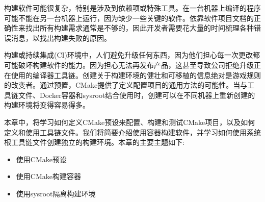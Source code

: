 构建软件可能很复杂，特别是涉及到依赖项或特殊工具。在一台机器上编译的程序可能不能在另一台机器上运行，因为缺少一些关键的软件。依靠软件项目文档的正确性来找出所有构建需求通常是不够的，因此开发者需要花大量的时间梳理各种错误消息，以找出构建失败的原因。

构建或持续集成(CI)环境中，人们避免升级任何东西，因为他们担心每一次更改都可能破坏构建软件的能力。因为担心无法再发布产品，这甚至导致公司拒绝升级正在使用的编译器工具链。创建关于构建环境的健壮和可移植的信息绝对是游戏规则的改变者。通过预置，CMake提供了定义配置项目的通用方法的可能性。当与工具链文件、Docker容器和sysroot结合使用时，创建可以在不同机器上重新创建的构建环境将变得容易得多。

本章中，将学习如何定义CMake预设来配置、构建和测试CMake项目，以及如何定义和使用工具链文件。我们将简要介绍使用容器构建软件，并学习如何使用系统根工具链文件创建独立的构建环境。本章的主要主题如下:

\begin{itemize}
\item 
使用CMake预设

\item 
使用CMake构建容器

\item 
使用sysroot隔离构建环境
\end{itemize}






































